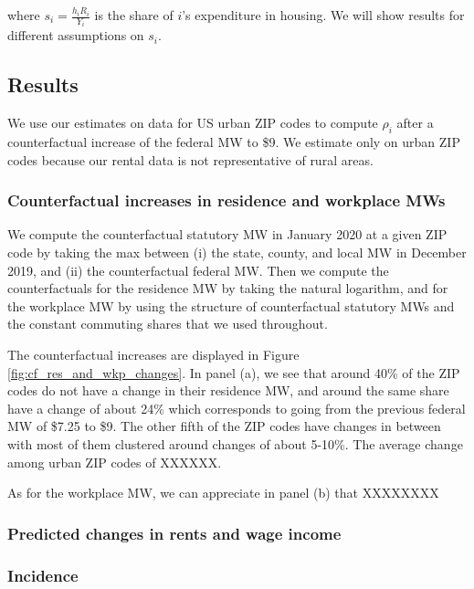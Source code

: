 where $s_i = \frac{h_i R_i}{Y_i}$ is the share of $i$'s expenditure in housing. 
We will show results for different assumptions on $s_i$.

\subsection{Results}

We use our estimates on data for US urban ZIP codes to compute $\rho_i$ after a 
counterfactual increase of the federal MW to \$9. We estimate only on urban ZIP codes
because our rental data is not representative of rural areas.

\subsubsection{Counterfactual increases in residence and workplace MWs} \label{sec:cf_res_and_wkp_changes}

We compute the counterfactual statutory MW in January 2020 at a given ZIP code by taking 
the max between (i) the state, county, and local MW in December 2019, and (ii) the 
counterfactual federal MW. Then we compute the counterfactuals for the residence MW by 
taking the natural logarithm, and for the workplace MW by using the structure of counterfactual 
statutory MWs and the constant commuting shares that we used throughout.

The counterfactual increases are displayed in Figure \ref{fig:cf_res_and_wkp_changes}. 
In panel (a), we see that around 40\% of the ZIP codes do not have a change in their 
residence MW, and around the same share have a change of about 24\% which corresponds 
to going from the previous federal MW of \$7.25 to \$9. The other fifth of the ZIP 
codes have changes in between with most of them clustered around changes of about 
5-10\%. The average change among urban ZIP codes of XXXXXX.


As for the workplace MW, we can appreciate in panel (b) that XXXXXXXX


\subsubsection{Predicted changes in rents and wage income}

\subsubsection{Incidence}




